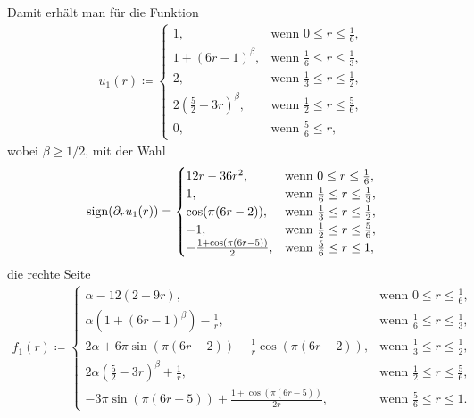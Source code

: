 Damit erhält man für die Funktion
\begin{align*}
  u_1(r)\coloneqq
  \begin{cases}
    1, & \text{wenn } 0\leq r\leq\frac{1}{6},\\
    1+(6r-1)^\beta, & \text{wenn } \frac{1}{6}\leq r\leq\frac{1}{3},\\
    2, &\text{wenn } \frac{1}{3}\leq r\leq\frac{1}{2},\\
    2(\frac{5}{2}-3r)^\beta, &\text{wenn } \frac{1}{2}\leq r\leq\frac{5}{6},\\
    0, &\text{wenn } \frac{5}{6}\leq r,
  \end{cases}
\end{align*}
wobei $\beta\geq 1/2$, mit der Wahl
\begin{align*}
  \operatorname{sign}(\partial_r u_1(r)) =
  \begin{cases}
    12r-36r^2, & \text{wenn } 0\leq r\leq\frac{1}{6},\\
    1, & \text{wenn } \frac{1}{6}\leq r\leq\frac{1}{3},\\
    \cos(\pi(6r-2)), &\text{wenn } \frac{1}{3}\leq r\leq\frac{1}{2},\\
    -1, &\text{wenn } \frac{1}{2}\leq r\leq\frac{5}{6},\\
    -\frac{1+\cos(\pi(6r-5))}{2}, &\text{wenn } \frac{5}{6}\leq r\leq 1,
  \end{cases}
\end{align*}
die rechte Seite
\begin{align*}
  f_1(r)\coloneqq 
  \begin{cases}
    \alpha-12(2-9r), & \text{wenn } 0\leq r\leq\frac{1}{6},\\
    \alpha(1+(6r-1)^\beta)-\frac{1}{r}, & \text{wenn } \frac{1}{6}\leq r\leq
    \frac{1}{3},\\
    2\alpha+6\pi\sin(\pi(6r-2))-\frac{1}{r}\cos(\pi(6r-2)), &
    \text{wenn } \frac{1}{3}\leq r\leq\frac{1}{2},\\
    2\alpha(\frac{5}{2}-3r)^\beta+\frac{1}{r},&
    \text{wenn } \frac{1}{2}\leq r\leq\frac{5}{6},\\
    -3\pi\sin(\pi(6r-5))+\frac{1+\cos(\pi(6r-5))}{2r}, &
    \text{wenn } \frac{5}{6}\leq r\leq 1.
  \end{cases}
\end{align*}


